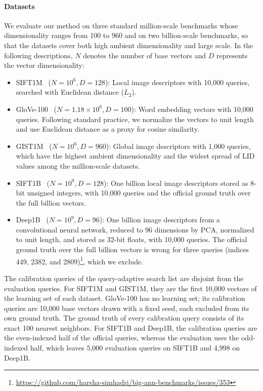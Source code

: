\documentclass{article}
\theoremstyle{plain}
\theoremstyle{definition}
\theoremstyle{remark}
\begin{document}
\paragraph{Datasets}
We evaluate our method on three standard million-scale benchmarks whose dimensionality ranges from 100 to 960 and on two billion-scale benchmarks, so that the datasets cover both high ambient dimensionality and large scale. In the following descriptions, $N$ denotes the number of base vectors and $D$ represents the vector dimensionality:
\begin{itemize}
    \item SIFT1M~\cite{jegou2011product} ($N=10^6, D=128$): Local image descriptors with 10{,}000 queries, searched with Euclidean distance ($L_2$).
    \item GloVe-100~\cite{pennington2014glove} ($N=1.18 \times 10^6, D=100$): Word embedding vectors with 10{,}000 queries. Following standard practice, we normalize the vectors to unit length and use Euclidean distance as a proxy for cosine similarity.
    \item GIST1M~\cite{jegou2011product} ($N=10^6, D=960$): Global image descriptors with 1{,}000 queries, which have the highest ambient dimensionality and the widest spread of LID values among the million-scale datasets.
    \item SIFT1B~\cite{jegou2011searching} ($N=10^9, D=128$): One billion local image descriptors stored as 8-bit unsigned integers, with 10{,}000 queries and the official ground truth over the full billion vectors.
    \item Deep1B~\cite{babenko2016efficient} ($N=10^9, D=96$): One billion image descriptors from a convolutional neural network, reduced to 96 dimensions by PCA, normalized to unit length, and stored as 32-bit floats, with 10{,}000 queries. The official ground truth over the full billion vectors is wrong for three queries (indices 449, 2382, and 2809)\footnote{\url{https://github.com/harsha-simhadri/big-ann-benchmarks/issues/353}}, which we exclude.
\end{itemize}
The calibration queries of the query-adaptive search list are disjoint from the evaluation queries. For SIFT1M and GIST1M, they are the first 10{,}000 vectors of the learning set of each dataset. GloVe-100 has no learning set; its calibration queries are 10{,}000 base vectors drawn with a fixed seed, each excluded from its own ground truth. The ground truth of every calibration query consists of its exact 100 nearest neighbors. For SIFT1B and Deep1B, the calibration queries are the even-indexed half of the official queries, whereas the evaluation uses the odd-indexed half, which leaves 5{,}000 evaluation queries on SIFT1B and 4{,}998 on Deep1B.
\end{document}
